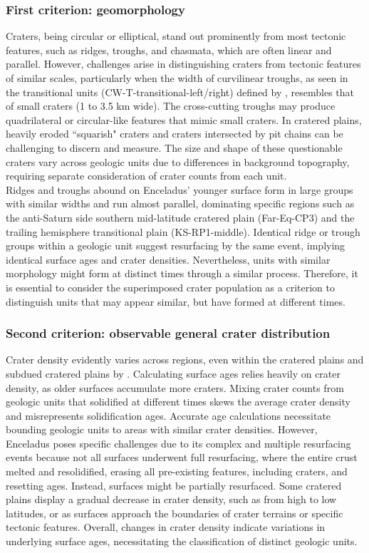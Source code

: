 \documentclass[preprint,12pt,3p,times,authoryear]{elsarticle}
\begin{document}
\subsubsection{First criterion: geomorphology}
Craters, being circular or elliptical, stand out prominently from most tectonic features, such as ridges, troughs, and chasmata, which are often linear and parallel. However, challenges arise in distinguishing craters from tectonic features of similar scales, particularly when the width of curvilinear troughs, as seen in the transitional units (CW-T-transitional-left/right) defined by \citet{CrowWillard2015}, resembles that of small craters (1 to 3.5 km wide). The cross-cutting troughs may produce quadrilateral or circular-like features that mimic small craters. In cratered plains, heavily eroded ``squarish" craters and craters intersected by pit chains can be challenging to discern and measure. The size and shape of these questionable craters vary across geologic units due to differences in background topography, requiring separate consideration of crater counts from each unit.\\

Ridges and troughs abound on Enceladus’ younger surface form in large groups with similar widths and run almost parallel, dominating specific regions such as the anti-Saturn side southern mid-latitude cratered plain (Far-Eq-CP3) and the trailing hemisphere transitional plain (KS-RP1-middle). Identical ridge or trough groups within a geologic unit suggest resurfacing by the same event, implying identical surface ages and crater densities. Nevertheless, units with similar morphology might form at distinct times through a similar process. Therefore, it is essential to consider the superimposed crater population as a criterion to distinguish units that may appear similar, but have formed at different times.

\subsubsection{Second criterion: observable general crater distribution}
Crater density evidently varies across regions, even within the cratered plains and subdued cratered plains by \citet{CrowWillard2015}. Calculating surface ages relies heavily on crater density, as older surfaces accumulate more craters. Mixing crater counts from geologic units that solidified at different times skews the average crater density and misrepresents solidification ages. Accurate age calculations necessitate bounding geologic units to areas with similar crater densities. However, Enceladus poses specific challenges due to its complex and multiple resurfacing events because not all surfaces underwent full resurfacing, where the entire crust melted and resolidified, erasing all pre-existing features, including craters, and resetting ages. Instead, surfaces might be partially resurfaced. Some cratered plains display a gradual decrease in crater density, such as from high to low latitudes, or as surfaces approach the boundaries of crater terrains or specific tectonic features. Overall, changes in crater density indicate variations in underlying surface ages, necessitating the classification of distinct geologic units.\\
\end{document}
